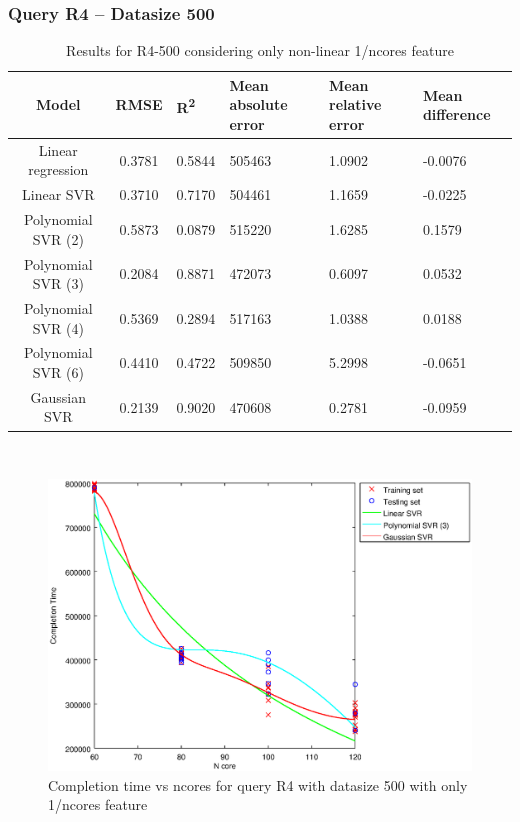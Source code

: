 \documentclass[a4paper,11pt]{article}
\begin{document}
\newpage
\subsubsection{Query R4 -- Datasize 500}
\begin{table}[H]
	\centering
	\begin{adjustbox}{center}
		\begin{tabular}{c | c M{1.2cm} M{2.5cm} M{2.5cm} M{1.8cm}}
			Model & RMSE & R\textsuperscript{2} & Mean absolute error & Mean relative error & Mean difference \tabularnewline
			\hline
			Linear regression & 0.3781 & 0.5844 & 505463 & 1.0902 & -0.0076 \\
			Linear SVR & 0.3710 & 0.7170 & 504461 & 1.1659 & -0.0225 \\
			Polynomial SVR (2) & 0.5873 & 0.0879 & 515220 & 1.6285 & 0.1579 \\
			Polynomial SVR (3) & 0.2084 & 0.8871 & 472073 & 0.6097 & 0.0532 \\
			Polynomial SVR (4) & 0.5369 & 0.2894 & 517163 & 1.0388 & 0.0188 \\
			Polynomial SVR (6) & 0.4410 & 0.4722 & 509850 & 5.2998 & -0.0651 \\
			Gaussian SVR & 0.2139 & 0.9020 & 470608 & 0.2781 & -0.0959 \\
		\end{tabular}
	\end{adjustbox}
	\\
	\caption{Results for R4-500 considering only non-linear 1/ncores feature}
	\label{table_R4_prediction_all}
\end{table}

\begin {figure}[hbtp]
\centering
\includegraphics[width=\textwidth]{output/R4_500_ONLY_1_OVER_NCORES/plot_R4_500_bestmodels.eps}
\caption {Completion time vs ncores for query R4 with datasize 500 with only 1/ncores feature}
\end {figure}
\end{document}
